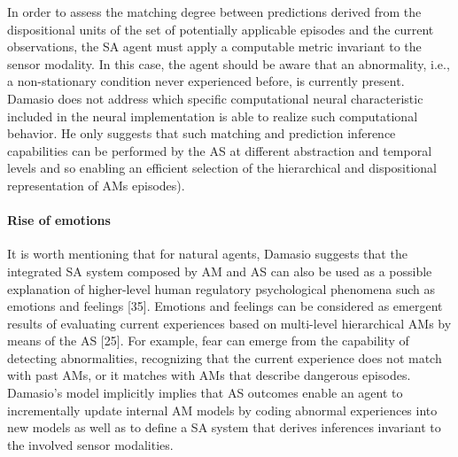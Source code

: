 \documentclass{article}
\begin{document}
			In order to assess the matching degree between predictions derived from the dispositional units of the set of potentially applicable episodes and the current observations, the SA agent must apply a computable metric invariant to the sensor modality. In this case, the agent should be aware that an
			abnormality, i.e., a non-stationary condition never experienced before, is currently present. Damasio does not address which specific computational neural characteristic included in the
			neural implementation is able to realize such computational behavior. He only suggests that such matching and prediction inference capabilities can be performed by the AS at different
			abstraction and temporal levels and so enabling an efficient selection of the hierarchical and dispositional representation of AMs episodes).
			\paragraph{Rise of emotions} It is worth mentioning that for natural agents, Damasio suggests that the integrated SA system composed by AM and AS can also be used as a possible explanation of higher-level human regulatory psychological phenomena such as emotions and feelings \citet{regazzoni-2020-multi-sensorial-generative-and-descriptive-self-awareness-models-for-autonomous-systems}[35]. Emotions and feelings can be considered as emergent results of evaluating current experiences based on multi-level hierarchical AMs by means of the AS \citet{regazzoni-2020-multi-sensorial-generative-and-descriptive-self-awareness-models-for-autonomous-systems}[25].
			For example, fear can emerge from the capability of detecting abnormalities, recognizing that the current experience does not match with past AMs, or it matches with AMs that describe
			dangerous episodes. Damasio’s model implicitly implies that AS outcomes enable an agent to incrementally update internal AM models by coding abnormal experiences into new models as well as to define a SA system that derives inferences invariant to the involved sensor modalities.
			
			
\end{document}
